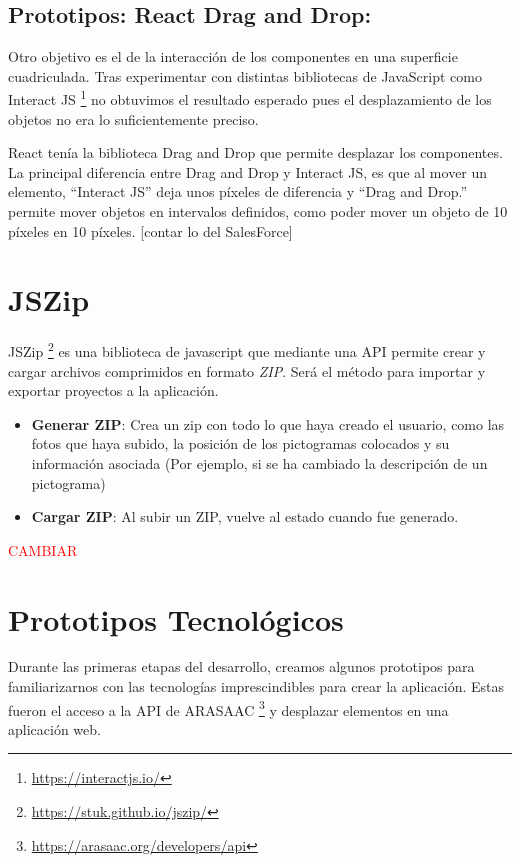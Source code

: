 \subsection{Prototipos: React Drag and Drop:}

Otro objetivo es el de la interacción de los componentes en una superficie cuadriculada. Tras experimentar con distintas bibliotecas de JavaScript como Interact JS \footnote{\url{https://interactjs.io/}} no obtuvimos el resultado esperado pues el desplazamiento de los objetos no era lo suficientemente preciso.

React tenía la biblioteca Drag and Drop que permite desplazar los componentes. La principal diferencia entre Drag and Drop y Interact JS, es que al mover un elemento, “Interact JS”  deja unos píxeles de diferencia y “Drag and Drop.” permite mover objetos en intervalos definidos, como poder mover un objeto de 10 píxeles en 10 píxeles. [contar lo del SalesForce]

\section{JSZip}

JSZip \footnote{\url{https://stuk.github.io/jszip/}} es una biblioteca de javascript que mediante una API permite crear y cargar archivos comprimidos en formato \textit{ZIP}. Será el método para importar y exportar proyectos a la aplicación.
\begin{itemize}
	\item \textbf{Generar ZIP}: Crea un zip con todo lo que haya creado el usuario, como las fotos que haya subido, la posición de los pictogramas colocados y su información asociada (Por ejemplo, si se ha cambiado la descripción de un pictograma)
	\item \textbf{Cargar ZIP}: Al subir un ZIP, vuelve al estado cuando fue generado.
\end{itemize}	


\textcolor{red}{CAMBIAR}


\section{Prototipos Tecnológicos}

Durante las primeras etapas del desarrollo, creamos algunos prototipos para familiarizarnos con las tecnologías imprescindibles para crear la aplicación. Estas fueron el acceso a la API de ARASAAC \footnote{\url{https://arasaac.org/developers/api}} y desplazar elementos en una aplicación web.




